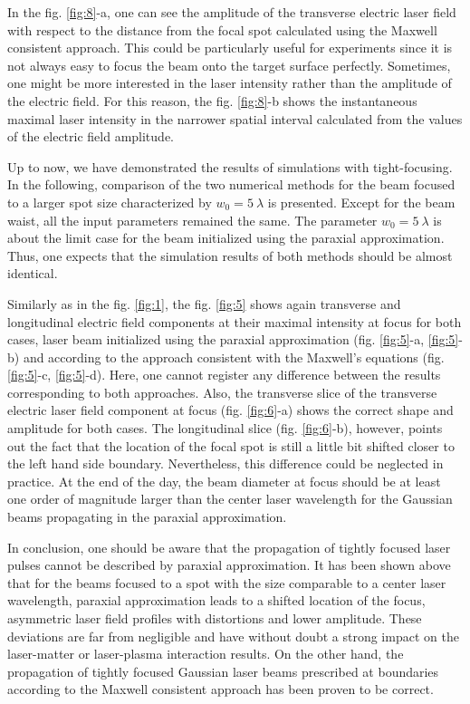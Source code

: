 In the fig. \ref{fig:8}-a, one can see the amplitude of the transverse electric laser field with respect to the distance from the focal spot calculated using the Maxwell consistent approach. This could be particularly useful for experiments since it is not always easy to focus the beam onto the target surface perfectly. Sometimes, one might be more interested in the laser intensity rather than the amplitude of the electric field. For this reason, the fig. \ref{fig:8}-b shows the instantaneous maximal laser intensity in the narrower spatial interval calculated from the values of the electric field amplitude.

Up to now, we have demonstrated the results of simulations with tight-focusing. In the following, comparison of the two numerical methods for the beam focused to a larger spot size characterized by $ w_0 = 5 \ \lambda $ is presented. Except for the beam waist, all the input parameters remained the same. The parameter $ w_0 = 5 \ \lambda $ is about the limit case for the beam initialized using the paraxial approximation. Thus, one expects that the simulation results of both methods should be almost identical.

Similarly as in the fig. \ref{fig:1}, the fig. \ref{fig:5} shows again transverse and longitudinal electric field components at their maximal intensity at focus for both cases, laser beam initialized using the paraxial approximation (fig. \ref{fig:5}-a, \ref{fig:5}-b) and according to the approach consistent with the Maxwell's equations (fig. \ref{fig:5}-c, \ref{fig:5}-d). Here, one cannot register any difference between the results corresponding to both approaches. Also, the transverse slice of the transverse electric laser field component at focus (fig. \ref{fig:6}-a) shows the correct shape and amplitude for both cases. The longitudinal slice (fig. \ref{fig:6}-b), however, points out the fact that the location of the focal spot is still a little bit shifted closer to the left hand side boundary. Nevertheless, this difference could be neglected in practice. At the end of the day, the beam diameter at focus should be at least one order of magnitude larger than the center laser wavelength for the Gaussian beams propagating in the paraxial approximation.

In conclusion, one should be aware that the propagation of tightly focused laser pulses cannot be described by paraxial approximation. It has been shown above that for the beams focused to a spot with the size comparable to a center laser wavelength, paraxial approximation leads to a shifted location of the focus, asymmetric laser field profiles with distortions and lower amplitude. These deviations are far from negligible and have without doubt a strong impact on the laser-matter or laser-plasma interaction results. On the other hand, the propagation of tightly focused Gaussian laser beams prescribed at boundaries according to the Maxwell consistent approach has been proven to be correct.

